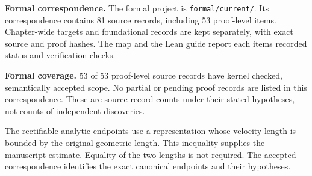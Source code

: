 \textbf{Formal correspondence.} The formal project is \texttt{formal/current/}. Its correspondence contains 81 source records, including 53 proof-level items. Chapter-wide targets and foundational records are kept separately, with exact source and proof hashes. The map and the Lean guide report each item\textquotesingle s recorded status and verification checks.

\textbf{Formal coverage.} 53 of 53 proof-level source records have kernel checked, semantically accepted scope. No partial or pending proof records are listed in this correspondence. These are source-record counts under their stated hypotheses, not counts of independent discoveries.


The rectifiable analytic endpoints use a representation whose velocity length is bounded by the original geometric length. This inequality supplies the manuscript estimate. Equality of the two lengths is not required. The accepted correspondence identifies the exact canonical endpoints and their hypotheses.

